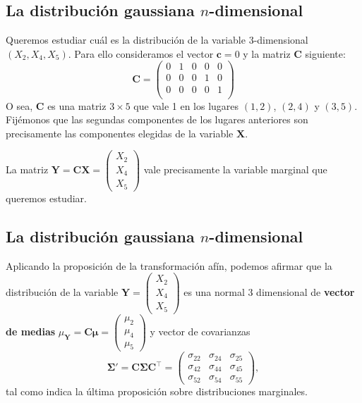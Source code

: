 \documentclass[]{book}
\begin{document}
\hypertarget{la-distribuciuxf3n-gaussiana-n-dimensional-6}{%
\subsection{\texorpdfstring{La distribución gaussiana \(n\)-dimensional}{La distribución gaussiana n-dimensional}}\label{la-distribuciuxf3n-gaussiana-n-dimensional-6}}

Queremos estudiar cuál es la distribución de la variable \(3\)-dimensional \((X_2,X_4,X_5)\). Para ello consideramos el vector \(\mathbf{c}=0\) y la matriz \(\mathbf{C}\) siguiente:
\[
\mathbf{C}=\begin{pmatrix}
0 & 1 & 0 & 0 & 0 \\
0 & 0 & 0 & 1 & 0 \\
0 & 0 & 0 & 0 & 1 \\
\end{pmatrix}
\]
O sea, \(\mathbf{C}\) es una matriz \(3\times 5\) que vale 1 en los lugares \((1,2)\), \((2,4)\) y \((3,5)\). Fijémonos que las segundas componentes de los lugares anteriores son precisamente las componentes elegidas de la variable \(\mathbf{X}\).

La matriz \(\mathbf{Y}=\mathbf{C}\mathbf{X}=\begin{pmatrix}X_2\\X_4\\X_5\end{pmatrix}\) vale precisamente la variable marginal que queremos estudiar.

\hypertarget{la-distribuciuxf3n-gaussiana-n-dimensional-7}{%
\subsection{\texorpdfstring{La distribución gaussiana \(n\)-dimensional}{La distribución gaussiana n-dimensional}}\label{la-distribuciuxf3n-gaussiana-n-dimensional-7}}

Aplicando la proposición de la transformación afín, podemos afirmar que la distribución de la variable \(\mathbf{Y}=\begin{pmatrix}X_2\\X_4\\X_5\end{pmatrix}\) es una normal \(3\) dimensional de \textbf{vector de medias} \(\mu_{\mathbf{Y}}=\mathbf{C}\mathbf{\mu}=\begin{pmatrix}\mu_2\\\mu_4\\\mu_5\end{pmatrix}\) y vector de covarianzas
\[
\mathbf{\Sigma'}=\mathbf{C}\mathbf{\Sigma}\mathbf{C}^\top = \begin{pmatrix}\sigma_{22} & \sigma_{24} & \sigma_{25}\\ \sigma_{42} & \sigma_{44} & \sigma_{45} \\  \sigma_{52} & \sigma_{54} & \sigma_{55}\end{pmatrix}, 
\]
tal como indica la última proposición sobre distribuciones marginales.
\end{document}
